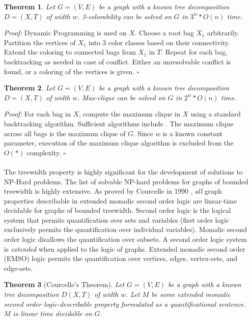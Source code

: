 \documentclass[12pt,conference]{IEEEtran}
\theoremstyle{plain}
\newtheorem{theorem}{Theorem}
\begin{document}
\begin{theorem}
  Let $G=(V,E)$ be a graph with a known tree decomposition $D=(X,T)$ of width $w$. 3-colorability can be solved on $G$ in $3^{w}*O(n)$ time.
\end{theorem}

\textit{Proof:} Dynamic Programming is used on $X$. Choose a root bag $X_{1}$ arbitrarily. Partition the vertices of $X_{1}$ into 3 color classes based on their connectivity. Extend the coloring to connected bags from $X_{1}$ in $T$. Repeat for each bag, backtracking as needed in case of conflict. Either an unresolvable conflict is found, or a coloring of the vertices is given. $\square$

\begin{theorem}
  Let $G=(V,E)$ be a graph with a known tree decomposition $D=(X,T)$ of width $w$. Max-clique can be solved on $G$ in $2^{w}*O(n)$ time.
\end{theorem}

\textit{Proof:} For each bag in $X$, compute the maximum clique in $X$ using a standard backtracking algorithm. Sufficient algorithms include \cite{max-clique-exp-time}. The maximum clique across all bags is the maximum clique of $G$. Since $w$ is a known constant parameter, execution of the maximum clique algorithm is excluded from the $O(*)$ complexity. $\square$
\\
\\
The treewidth property is highly significant for the development of solutions to NP-Hard problems. The list of solvable NP-hard problems for graphs of bounded treewidth is highly extensive. As proved by Courcelle in 1990 \cite{courcelle-original}, \textit{all} graph properties describable in extended monadic second order logic are linear-time decidable for graphs of bounded treewidth. Second order logic is the logical system that permits quantification over sets and variables (first order logic exclusively permits the quantification over individual variables). Monadic second order logic disallows the quantification over subsets. A second order logic system is \textit{extended} when applied to the logic of graphs. Extended monadic second order (EMSO) logic permits the quantification over vertices, edges, vertex-sets, and edge-sets.

\begin{theorem}[Courcelle's Theorem]
  Let $G=(V,E)$ be a graph with a known tree decomposition $D(X,T)$ of width $w$. Let $M$ be some extended monadic second order logic-describable property formulated as a quantificational sentence. $M$ is linear time decidable on $G$.
\end{theorem}
\end{document}
